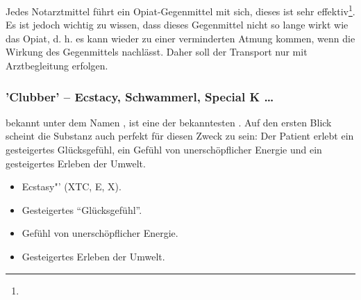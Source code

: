 {
Jedes Notarztmittel führt ein Opiat-Gegenmittel mit sich,
dieses ist sehr effektiv\footnote{}. Es ist
jedoch wichtig zu wissen, dass dieses Gegenmittel nicht so
lange wirkt wie das Opiat, d. h. es kann wieder zu einer
verminderten Atmung kommen, wenn die Wirkung des Gegenmittels nachlässt. Daher soll der Transport nur mit Arztbegleitung erfolgen.

}{

}{}{}{}



\subsubsection{'Clubber' -- Ecstacy, Schwammerl,
Special K \ldots}

{
 bekannt
unter dem Namen , ist eine der
bekanntesten . Auf den ersten Blick
scheint die Substanz auch perfekt für diesen Zweck zu sein:
Der Patient erlebt ein gesteigertes Glücksgefühl, ein
Gefühl von unerschöpflicher Energie und ein gesteigertes
Erleben der Umwelt. 
}{
\begin{itemize}
  \item Ecstasy"' (XTC, E, X).
  \item Gesteigertes "`Glücksgefühl"'.
  \item Gefühl von unerschöpflicher Energie.
  \item Gesteigertes Erleben der Umwelt.
\end{itemize}
}{}{}{}


